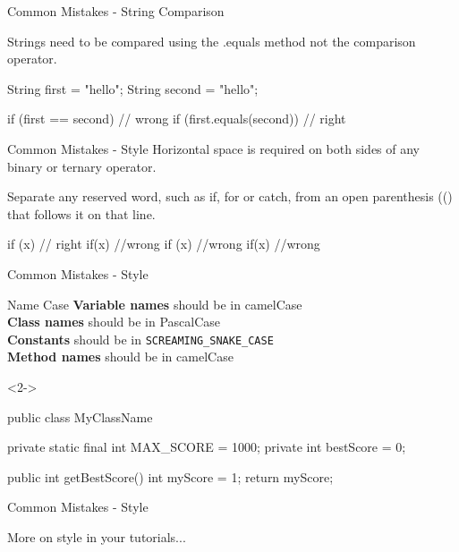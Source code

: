 \documentclass[12]{beamer}
\begin{document}
\begin{frame}[t, fragile]{Common Mistakes - String Comparison} \vspace{4pt}

Strings need to be compared using the .equals method not the comparison operator.

\begin{java}
String first = "hello";
String second = "hello";

if (first == second) {} // wrong
if (first.equals(second)) {} // right
\end{java}

\end{frame}

\begin{frame}[t, fragile]{Common Mistakes - Style} \vspace{4pt}
Horizontal space is required on both sides of any binary or ternary operator.

Separate any reserved word, such as if, for or catch, from an open parenthesis (() that follows it on that line.

\begin{java}
if (x) {} // right
if(x){} //wrong
if (x){} //wrong
if(x) {} //wrong
\end{java}

\end{frame}

\begin{frame}[t, fragile]{Common Mistakes - Style} \vspace{4pt}

\begin{block}{Name Case}
\textbf{Variable names} should be in camelCase\\
\textbf{Class names} should be in PascalCase\\
\textbf{Constants} should be in \verb|SCREAMING_SNAKE_CASE|\\
\textbf{Method names} should be in camelCase\\[10pt]
\end{block}

\begin{onlyenv}<2->
\begin{java}
public class MyClassName {
	private static final int MAX_SCORE = 1000;
	private int bestScore = 0;

	public int getBestScore() {
		int myScore = 1;
		return myScore;
	}
}
\end{java}
\end{onlyenv}
\end{frame}

\begin{frame}[t, fragile]{Common Mistakes - Style} \vspace{4pt}

More on style in your tutorials...

\end{frame}
\end{document}
